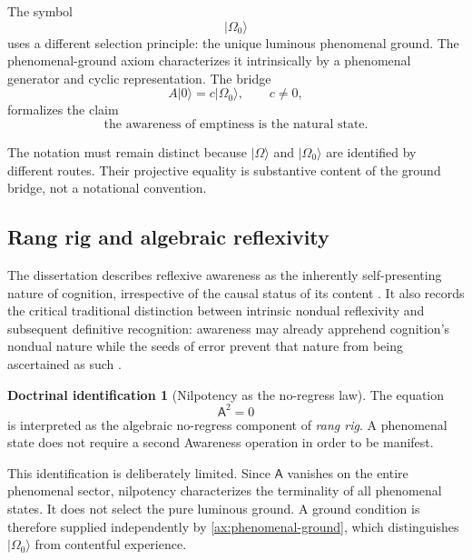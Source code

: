 \documentclass[11pt,reqno]{scrartcl}
\newcommand{\Aodd}{\mathsf A}
\newcommand{\ket}[1]{\lvert #1\rangle}
\theoremstyle{plain}
\theoremstyle{definition}
\newtheorem{identification}[identification]{Doctrinal identification}
\theoremstyle{remark}
\begin{document}
The symbol
\begin{equation}
  \ket{\Omega_0}
  \label{eq:Omega0-doctrinal}
\end{equation}
uses a different selection principle: the unique luminous phenomenal ground.
The phenomenal-ground axiom characterizes it intrinsically by a phenomenal
generator and cyclic representation.  The bridge
\begin{equation}
  A\ket0=c\ket{\Omega_0},
  \qquad c\neq0,
  \label{eq:ground-bridge-preview2}
\end{equation}
formalizes the claim
\begin{equation}
  \boxed{
  \text{the awareness of emptiness is the natural state}.}
  \label{eq:awareness-emptiness-natural}
\end{equation}

The notation must remain distinct because \(\ket\Omega\) and
\(\ket{\Omega_0}\) are identified by different routes.  Their projective equality is substantive content of the ground bridge, not a notational convention.

\subsection{Rang rig and algebraic reflexivity}

The dissertation describes reflexive awareness as the inherently
self-presenting nature of cognition, irrespective of the causal status of its
content \cite[p.~31]{Yiannopoulos2020}.  It also records the critical
traditional distinction between intrinsic nondual reflexivity and subsequent
definitive recognition: awareness may already apprehend cognition's nondual
nature while the seeds of error prevent that nature from being ascertained as
such \cite[p.~425]{Yiannopoulos2020}.

\begin{identification}[Nilpotency as the no-regress law]
\label{id:nilpotency-rangrig}
The equation
\begin{equation}
  \Aodd^2=0
  \label{eq:nilpotency-rangrig}
\end{equation}
is interpreted as the algebraic no-regress component of \emph{rang rig}.  A
phenomenal state does not require a second Awareness operation in order to be
manifest.
\end{identification}

This identification is deliberately limited.  Since \(\Aodd\) vanishes on
the entire phenomenal sector, nilpotency characterizes the terminality of all
phenomenal states.  It does not select the pure luminous ground.  A ground
condition is therefore supplied independently by
\cref{ax:phenomenal-ground}, which distinguishes \(\ket{\Omega_0}\) from
contentful experience.
\end{document}
